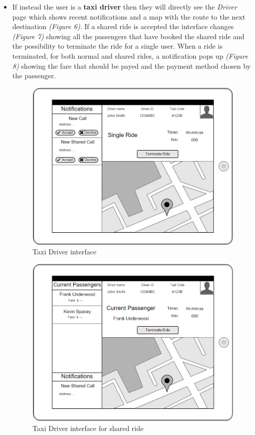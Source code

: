 \documentclass{article}
\begin{document}
\begin{itemize}
\newpage
    
    \item If instead the user is a \textbf{taxi driver} then they will directly see the \textit{Driver} page which shows recent notifications and a map with the route to the next destination \textit{(Figure 6)}. If a shared ride is accepted the interface changes \textit{(Figure 7)} showing all the passengers that have booked the shared ride and the possibility to terminate the ride for a single user. When a ride is terminated, for both normal and shared rides, a notification pops up \textit{(Figure 8)} showing the fare that should be payed and the payment method chosen by the passenger.
    \begin{figure}[h!]
        \centering
        \includegraphics[width=0.7\columnwidth]{driver/driver}
        \caption{Taxi Driver interface}
        \label{fig:tablet-driver}
    \end{figure}
    
    \begin{figure}[h!]
        \centering
        \includegraphics[width=0.7\columnwidth]{driver/driver-shared}
        \caption{Taxi Driver interface for shared ride}
        \label{fig:tablet-driver-shared}
    \end{figure}
    

\end{itemize}
\end{document}
